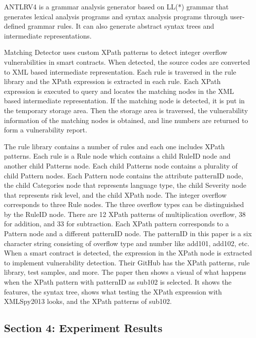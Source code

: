 \documentclass{article}
\begin{document}
ANTLRV4 is a grammar analysis generator based on LL(*) grammar that generates lexical analysis programs and syntax analysis programs through user-defined grammar rules. It can also generate abstract syntax trees and intermediate representations. 

Matching Detector uses custom XPath patterns to detect integer overflow vulnerabilities in smart contracts. When detected, the source codes are converted to XML based intermediate representation. Each rule is traversed in the rule library and the XPath expression is extracted in each rule. Each XPath expression is executed to query and locates the matching nodes in the XML based intermediate representation. If the matching node is detected, it is put in the temporary storage area. Then the storage area is traversed, the vulnerability information of the matching nodes is obtained, and line numbers are returned to form a vulnerability report. 

The rule library contains a number of rules and each one includes XPath patterns. Each rule is a Rule node which contains a child RuleID node and another child Patterns node. Each child Patterns node contains a plurality of child Pattern nodes. Each Pattern node contains the attribute patternID node, the child Categories node that represents language type, the child Severity node that represents risk level, and the child XPath node. The integer overflow corresponds to three Rule nodes. The three overflow types can be distinguished by the RuleID node. There are 12 XPath patterns of multiplication overflow, 38 for addition, and 33 for subtraction. Each XPath pattern corresponds to a Pattern node and a different patternID node. The patternID in this paper is a six character string consisting of overflow type and number like add101, add102, etc. When a smart contract is detected, the expression in the XPath node is extracted to implement vulnerability detection. Their GitHub has the XPath patterns, rule library, test samples, and more. The paper then shows a visual of what happens when the XPath pattern with patternID as sub102 is selected. It shows the features, the syntax tree, shows what testing the XPath expression with XMLSpy2013 looks, and the XPath patterns of sub102.

\subsection{Section 4: Experiment Results}
\end{document}
